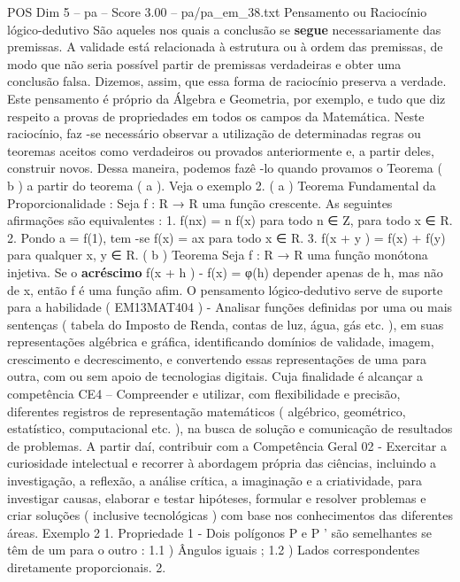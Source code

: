 \begin{textsample}{POS Dim 5 – pa – Score 3.00 – pa/pa\_em\_38.txt}  \label{ex:f5_pos_250}
Pensamento ou Raciocínio lógico-dedutivo São aqueles nos quais a conclusão se \textbf{segue} necessariamente das premissas.
A validade está relacionada à estrutura ou à ordem das premissas, de modo que não seria possível partir de premissas verdadeiras e obter uma conclusão falsa.
Dizemos, assim, que essa forma de raciocínio preserva a verdade.
Este pensamento é próprio da Álgebra e Geometria, por exemplo, e tudo que diz respeito a provas de propriedades em todos os campos da Matemática.
Neste raciocínio, faz -se necessário observar a utilização de determinadas regras ou teoremas aceitos como verdadeiros ou provados anteriormente e, a partir deles, construir novos.
Dessa maneira, podemos fazê -lo quando provamos o Teorema ( b ) a partir do teorema ( a ).
Veja o exemplo 2. ( a ) Teorema Fundamental da Proporcionalidade : Seja f : R → R uma função crescente.
As seguintes afirmações são equivalentes : 1. f(nx) = n f(x) para todo n ∈ Z, para todo x ∈ R. 2.
Pondo a = f(1), tem -se f(x) = ax para todo x ∈ R. 3. f(x + y ) = f(x) + f(y) para qualquer x, y ∈ R. ( b ) Teorema Seja f : R → R uma função monótona injetiva.
Se o \textbf{acréscimo} f(x + h ) - f(x) = φ(h) depender apenas de h, mas não de x, então f é uma função afim.
O pensamento lógico-dedutivo serve de suporte para a habilidade ( EM13MAT404 ) - Analisar funções definidas por uma ou mais sentenças ( tabela do Imposto de Renda, contas de luz, água, gás etc. ), em suas representações algébrica e gráfica, identificando domínios de validade, imagem, crescimento e decrescimento, e convertendo essas representações de uma para outra, com ou sem apoio de tecnologias digitais.
Cuja finalidade é alcançar a competência CE4 – Compreender e utilizar, com flexibilidade e precisão, diferentes registros de representação matemáticos ( algébrico, geométrico, estatístico, computacional etc. ), na busca de solução e comunicação de resultados de problemas.
A partir daí, contribuir com a Competência Geral 02 - Exercitar a curiosidade intelectual e recorrer à abordagem própria das ciências, incluindo a investigação, a reflexão, a análise crítica, a imaginação e a criatividade, para investigar causas, elaborar e testar hipóteses, formular e resolver problemas e criar soluções ( inclusive tecnológicas ) com base nos conhecimentos das diferentes áreas.
Exemplo 2 1.
Propriedade 1 - Dois polígonos P e P ’ são semelhantes se têm de um para o outro : 1.1 ) Ângulos iguais ; 1.2 ) Lados correspondentes diretamente proporcionais. 2.

\end{textsample}
